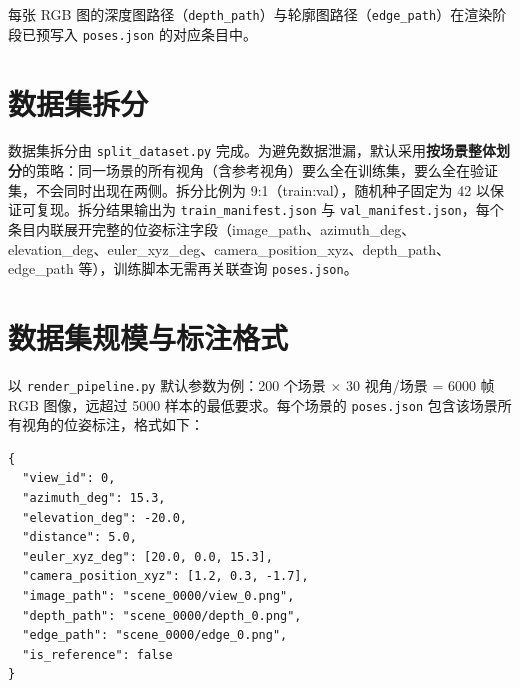 每张 RGB 图的深度图路径（\texttt{depth\_path}）与轮廓图路径（\texttt{edge\_path}）在渲染阶段已预写入 \texttt{poses.json} 的对应条目中。

\section{数据集拆分}

数据集拆分由 \texttt{split\_dataset.py} 完成。为避免数据泄漏，默认采用\textbf{按场景整体划分}的策略：同一场景的所有视角（含参考视角）要么全在训练集，要么全在验证集，不会同时出现在两侧。拆分比例为 9:1（train:val），随机种子固定为 42 以保证可复现。拆分结果输出为 \texttt{train\_manifest.json} 与 \texttt{val\_manifest.json}，每个条目内联展开完整的位姿标注字段（image\_path、azimuth\_deg、elevation\_deg、euler\_xyz\_deg、camera\_position\_xyz、depth\_path、edge\_path 等），训练脚本无需再关联查询 \texttt{poses.json}。

\section{数据集规模与标注格式}

以 \texttt{render\_pipeline.py} 默认参数为例：200 个场景 × 30 视角/场景 = 6000 帧 RGB 图像，远超过 5000 样本的最低要求。每个场景的 \texttt{poses.json} 包含该场景所有视角的位姿标注，格式如下：

\begin{verbatim}
{
  "view_id": 0,
  "azimuth_deg": 15.3,
  "elevation_deg": -20.0,
  "distance": 5.0,
  "euler_xyz_deg": [20.0, 0.0, 15.3],
  "camera_position_xyz": [1.2, 0.3, -1.7],
  "image_path": "scene_0000/view_0.png",
  "depth_path": "scene_0000/depth_0.png",
  "edge_path": "scene_0000/edge_0.png",
  "is_reference": false
}
\end{verbatim}
